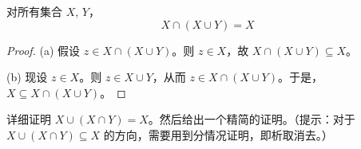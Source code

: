 \documentclass[../../../include/open-logic-section]{subfiles}
\begin{document}
\begin{prop}[吸收律]
对所有集合 $X$, $Y$，
\[
X \cap (X \cup Y) = X
\]
\end{prop}

\begin{proof}
(a) 假设 $z \in X \cap (X \cup Y)$。则 $z \in X$，故 $X \cap (X \cup Y) \subseteq X$。

(b) 现设 $z \in X$。则 $z \in X \cup Y$，从而 $z \in X \cap (X \cup Y)$。于是，$X \subseteq X \cap (X \cup Y)$。
\end{proof}

\begin{prob}
详细证明 $X \cup (X \cap Y) = X$。然后给出一个精简的证明。（提示：对于 $X \cup (X \cap Y) \subseteq X$ 的方向，需要用到分情况证明，即析取消去。）
\end{prob}
\end{document}
